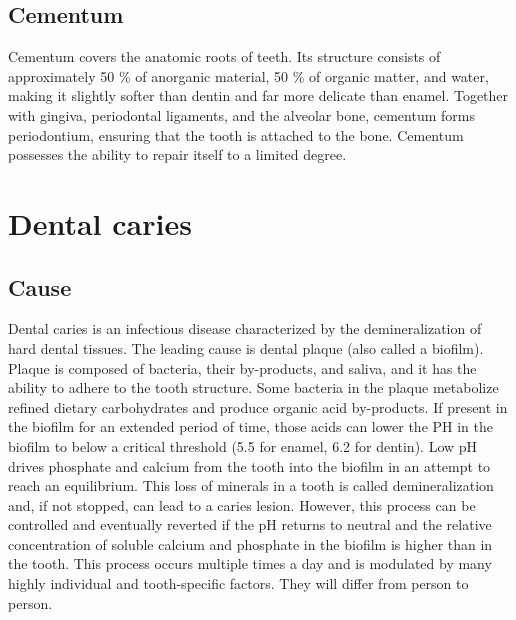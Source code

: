 \subsection*{Cementum}
Cementum covers the anatomic roots of teeth. Its structure consists of approximately 50 \% of anorganic material, 50 \% of organic matter, and water, making it slightly softer than dentin and far more delicate than enamel. Together with gingiva, periodontal ligaments, and the alveolar bone, cementum forms periodontium, ensuring that the tooth is attached to the bone. Cementum possesses the ability to repair itself to a limited degree.

\section{Dental caries}

\subsection{Cause}
Dental caries is an infectious disease characterized by the demineralization of hard dental tissues. The leading cause is dental plaque (also called a biofilm). Plaque is composed of bacteria, their by-products, and saliva, and it has the ability to adhere to the tooth structure. Some bacteria in the plaque metabolize refined dietary carbohydrates and produce organic acid by-products. If present in the biofilm for an extended period of time, those acids can lower the PH in the biofilm to below a critical threshold (5.5 for enamel, 6.2 for dentin)\cite{2019a}. Low pH drives phosphate and calcium from the tooth into the biofilm in an attempt to reach an equilibrium. This loss of minerals in a tooth is called demineralization and, if not stopped, can lead to a caries lesion. However, this process can be controlled and eventually reverted if the pH returns to neutral and the relative concentration of soluble calcium and phosphate in the biofilm is higher than in the tooth. This process occurs multiple times a day and is modulated by many highly individual and tooth-specific factors. They will differ from person to person.


